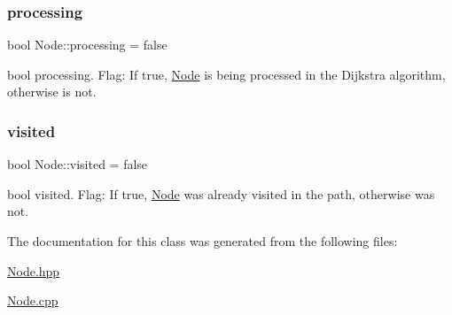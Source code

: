 \subsubsection{\texorpdfstring{processing}{processing}}
{\footnotesize\ttfamily bool Node\+::processing = false}

bool processing. Flag\+: If true, \hyperlink{class_node}{Node} is being processed in the Dijkstra algorithm, otherwise is not. \hypertarget{class_node_aa1bdec4e775fc578632e6a2dced9e251}{}\label{class_node_aa1bdec4e775fc578632e6a2dced9e251} 
\subsubsection{\texorpdfstring{visited}{visited}}
{\footnotesize\ttfamily bool Node\+::visited = false}

bool visited. Flag\+: If true, \hyperlink{class_node}{Node} was already visited in the path, otherwise was not. 

The documentation for this class was generated from the following files\+:\begin{DoxyCompactItemize}
\item 
\hyperlink{_node_8hpp}{Node.\+hpp}\item 
\hyperlink{_node_8cpp}{Node.\+cpp}\end{DoxyCompactItemize}
